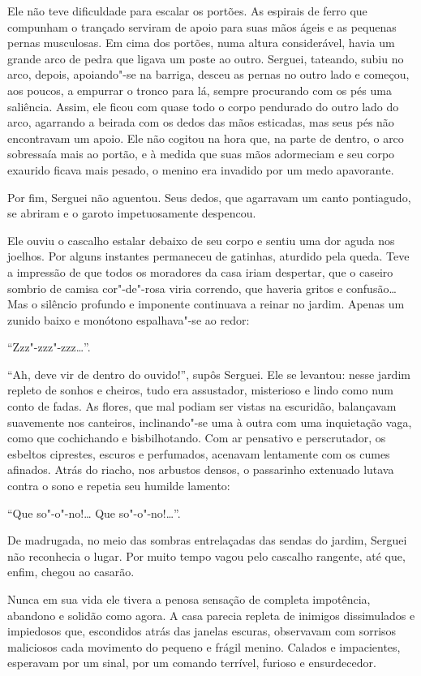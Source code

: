Ele não teve dificuldade para escalar os portões. As espirais de ferro
que compunham o trançado serviram de apoio para suas mãos ágeis e as
pequenas pernas musculosas. Em cima dos portões, numa altura
considerável, havia um grande arco de pedra que ligava um poste ao
outro. Serguei, tateando, subiu no arco, depois, apoiando"-se na barriga,
desceu as pernas no outro lado e começou, aos poucos, a empurrar o
tronco para lá, sempre procurando com os pés uma saliência. Assim, ele
ficou com quase todo o corpo pendurado do outro lado do arco, agarrando
a beirada com os dedos das mãos esticadas, mas seus pés não encontravam
um apoio. Ele não cogitou na hora que, na parte de dentro, o arco
sobressaía mais ao portão, e à medida que suas mãos adormeciam e seu
corpo exaurido ficava mais pesado, o menino era invadido por um medo
apavorante.

Por fim, Serguei não aguentou. Seus dedos, que agarravam um canto
pontiagudo, se abriram e o garoto impetuosamente despencou.

Ele ouviu o cascalho estalar debaixo de seu corpo e sentiu uma dor aguda
nos joelhos. Por alguns instantes permaneceu de gatinhas, aturdido
pela queda. Teve a impressão de que todos os moradores da casa iriam
despertar, que o caseiro sombrio de camisa cor"-de"-rosa viria correndo,
que haveria gritos e confusão\ldots{} Mas o silêncio profundo e imponente
continuava a reinar no jardim. Apenas um zunido baixo e monótono
espalhava"-se ao redor:

``Zzz"-zzz"-zzz\ldots{}''.

``Ah, deve vir de dentro do ouvido!'', supôs Serguei. Ele se levantou:
nesse jardim repleto de sonhos e cheiros, tudo era assustador,
misterioso e lindo como num conto de fadas. As flores, que mal podiam
ser vistas na escuridão, balançavam suavemente nos canteiros,
inclinando"-se uma à outra com uma inquietação vaga, como que cochichando
e bisbilhotando. Com ar pensativo e perscrutador, os esbeltos ciprestes,
escuros e perfumados, acenavam lentamente com os cumes afinados. Atrás
do riacho, nos arbustos densos, o passarinho extenuado lutava contra o
sono e repetia seu humilde lamento:

``Que so"-o"-no!\ldots{} Que so"-o"-no!\ldots{}''.

De madrugada, no meio das sombras entrelaçadas das sendas do jardim,
Serguei não reconhecia o lugar. Por muito tempo vagou pelo cascalho
rangente, até que, enfim, chegou ao casarão.

Nunca em sua vida ele tivera a penosa sensação de completa impotência,
abandono e solidão como agora. A casa parecia repleta de inimigos
dissimulados e impiedosos que, escondidos atrás das janelas escuras,
observavam com sorrisos maliciosos cada movimento do pequeno e frágil
menino. Calados e impacientes, esperavam por um sinal, por um comando
terrível, furioso e ensurdecedor.


